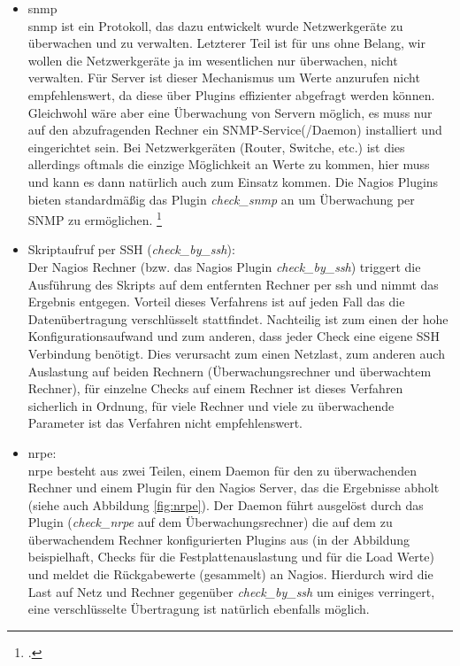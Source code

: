 \documentclass[12pt,a4paper,parskip,listof=totoc,bibliography=totoc]{scrreprt}
\begin{document}
	\begin{itemize}
		\item \acrfull{snmp}\\
		\acrshort{snmp} ist ein Protokoll, das dazu entwickelt wurde Netzwerkgeräte zu überwachen und zu verwalten. Letzterer Teil ist für uns ohne Belang, wir wollen die Netzwerkgeräte ja im wesentlichen nur überwachen, nicht verwalten. Für Server ist dieser Mechanismus um Werte anzurufen nicht empfehlenswert, da diese über Plugins effizienter abgefragt werden können. Gleichwohl wäre aber eine Überwachung von Servern möglich, es muss nur auf den abzufragenden Rechner ein SNMP-Service(/Daemon) installiert und eingerichtet sein. Bei Netzwerkgeräten (Router, Switche, etc.) ist dies allerdings oftmals die einzige Möglichkeit an Werte zu kommen, hier muss und kann es dann natürlich auch zum Einsatz kommen. Die Nagios Plugins bieten standardmäßig das Plugin \textit{check\_snmp} an um Überwachung per SNMP zu ermöglichen.
		\footcite[Kapitel 11]{barthnagios}
		\item Skriptaufruf per SSH (\textit{check\_by\_ssh}): \\
		Der Nagios Rechner (bzw. das Nagios Plugin \textit{check\_by\_ssh}) triggert die Ausführung des Skripts auf dem entfernten Rechner per ssh und nimmt das Ergebnis entgegen. Vorteil dieses Verfahrens ist auf jeden Fall das die Datenübertragung verschlüsselt stattfindet. Nachteilig ist zum einen der hohe Konfigurationsaufwand und zum anderen, dass jeder Check eine eigene SSH Verbindung benötigt. Dies verursacht zum einen Netzlast, zum anderen auch Auslastung auf beiden Rechnern (Überwachungsrechner und überwachtem Rechner), für einzelne Checks auf einem Rechner ist dieses Verfahren sicherlich in Ordnung, für viele Rechner und viele zu überwachende Parameter ist das Verfahren nicht empfehlenswert.
		\item \acrfull{nrpe}: \\
		\acrshort{nrpe} besteht aus zwei Teilen, einem Daemon für den zu überwachenden Rechner und einem Plugin für den Nagios Server, das die Ergebnisse abholt (siehe auch Abbildung \ref{fig:nrpe}). Der Daemon führt ausgelöst durch das Plugin (\textit{check\_nrpe} auf dem Überwachungsrechner) die auf dem zu überwachendem Rechner konfigurierten Plugins aus (in der Abbildung beispielhaft, Checks für die Festplattenauslastung und für die Load Werte) und meldet die Rückgabewerte (gesammelt) an Nagios. Hierdurch wird die Last auf Netz und Rechner gegenüber \textit{check\_by\_ssh} um einiges verringert, eine verschlüsselte Übertragung ist natürlich ebenfalls möglich.

\end{itemize}
\end{document}
